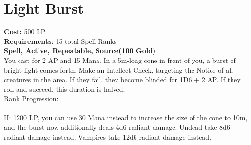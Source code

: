 \section{Light Burst}\label{spell:lightBurst}
\textbf{Cost:} 500 LP\\
\textbf{Requirements:} 15 total Spell Ranks\\
\textbf{Spell, Active, Repeatable, Source(100 Gold)}\\
You cast for 2 AP and 15 Mana.
In a 5m-long cone in front of you, a burst of bright light comes forth.
Make an Intellect Check, targeting the Notice of all creatures in the area.
If they fail, they become blinded for 1D6 + 2 AP.
If they roll and succeed, this duration is halved.
\\
Rank Progression:\\
\\
II: 1200 LP, you can use 30 Mana instead to increase the size of the cone to 10m, and the burst now additionally deals 4d6 radiant damage.
Undead take 8d6 radiant damage instead.
Vampires take 12d6 radiant damage instead.